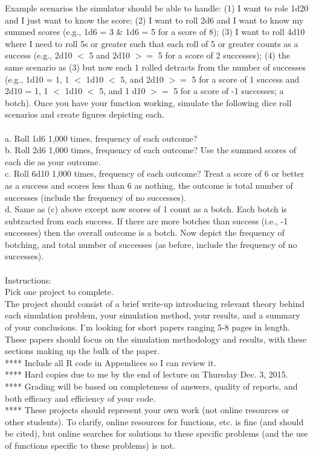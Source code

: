 \documentclass[onecolumn,10pt]{jhwhw}
\begin{document}
Example scenarios the simulator should be able to handle: (1) I want to role 1d20 and I just want to know the score; (2) I want to roll 2d6 and I want to know my summed scores (e.g., 1d6 = 3 \& 1d6 = 5 for a score of 8); (3) I want to roll 4d10 where I need to roll 5s or greater such that each roll of 5 or greater counts as a success (e.g., 2d10 $<$ 5 and 2d10 $>=$ 5 for a score of 2 successes); (4) the same scenario as (3) but now each 1 rolled detracts from the number of successes (e.g., 1d10 = 1, 1 $<$ 1d10 $<$ 5, and 2d10 $>=$ 5 for a score of 1 success and 2d10 = 1, 1 $<$ 1d10 $<$ 5, and 1 d10 $>=$ 5 for a score of -1 successes; a botch). Once you have your function working, simulate the following dice roll scenarios and create figures depicting each.\\
\\
a. Roll 1d6 1,000 times, frequency of each outcome?\\
b. Roll 2d6 1,000 times, frequency of each outcome? Use the summed scores of each die as your outcome.\\
c. Roll 6d10 1,000 times, frequency of each outcome? Treat a score of 6 or better as a success and scores less than 6 as nothing, the outcome is total number of successes (include the frequency of no successes).\\
d. Same as (c) above except now scores of 1 count as a botch. Each botch is subtracted from each success. If there are more botches than success (i.e., -1 successes) then the overall outcome is a botch. Now depict the frequency of botching, and total number of successes (as before, include the frequency of no successes).\\
\\
Instructions:\\
Pick one project to complete.\\
The project should consist of a brief write-up introducing relevant theory behind each simulation problem, your simulation method, your results, and a summary of your conclusions. I'm looking for short papers ranging 5-8 pages in length. These papers should focus on the simulation methodology and results, with these sections making up the bulk of the paper.\\
**** Include all R code in Appendices so I can review it.\\
**** Hard copies due to me by the end of lecture on Thursday Dec. 3, 2015.\\
**** Grading will be based on completeness of answers, quality of reports, and both efficacy and efficiency of your code.\\
**** These projects should represent your own work (not online resources or other students). To clarify, online resources for functions, etc. is fine (and should be cited), but online searches for solutions to these specific problems (and the use of functions specific to these problems) is not.
\end{document}
